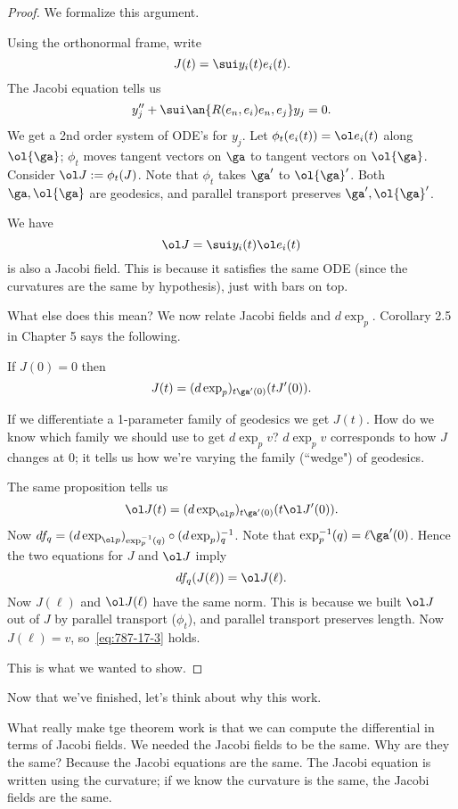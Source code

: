 \begin{proof}
We formalize this argument.

Using the orthonormal frame, write
\[
J(t)=\sui y_i(t) e_i(t). 
\]
The Jacobi equation tells us
\[
y_j''+\sui \an{R(e_n,e_i)e_n,e_j}y_j=0.
\]
We get a 2nd order system of ODE's for $y_j$. Let $\phi_t(e_i(t))=\ol e_i(t)$ along $\ol{\ga}$; $\phi_t$ moves tangent vectors on $\ga$ to tangent vectors on $\ol{\ga}$.  Consider $\ol J:=\phi_t(J)$. %
Note that $\phi_t$ takes $\ga'$ to $\ol{\ga}'$. Both $\ga,\ol{\ga}$ are geodesics, and parallel transport preserves $\ga',\ol{\ga}'$.

We have
\[
\ol J=\sui y_i(t)\ol e_i(t)
\] 
is also a Jacobi field. This is because it satisfies the same ODE (since the curvatures are the same by hypothesis), just with bars on top.

What else does this mean? We now relate Jacobi fields and $d\exp_p$. %
Corollary 2.5 in Chapter 5 says the following.
\begin{pr}
If $J(0)=0$ then 
\[J(t)=(d\exp_p)_{t\ga'(0)}(tJ'(0)).\]
\end{pr}
If we differentiate a 1-parameter family of geodesics we get $J(t)$. How do we know which family we should use to get $d\exp_pv$? %
$d\exp_pv$ corresponds to how $J$ changes at 0; it tells us how we're varying the family (``wedge") of geodesics.

The same proposition tells us
\[\ol J(t)=(d\exp_{\ol p})_{t\ga'(0)}(t\ol J'(0)).\]
Now $df_q=(d\exp_{\ol p})_{\exp_p^{-1}(q)}\circ (d\exp_p)_q^{-1}$. Note that $\exp_p^{-1}(q)=\ell \ga'(0)$. Hence the two equations for $J$ and $\ol J$ imply
\[
df_q(J(\ell))=\ol J(\ell).
\]
Now $J(\ell)$ and $\ol J(\ell)$ have the same norm. This is because we built $\ol J$ out of $J$ by parallel transport ($\phi_t$), and parallel transport preserves length. Now $J(\ell)=v$, so~\eqref{eq:787-17-3} holds.

This is what we wanted to show.
\end{proof}

Now that we've finished, let's think about why this work.

What really make tge theorem work is that we can compute the differential in terms of Jacobi fields. We needed the Jacobi fields to be the same. Why are they the same? Because the Jacobi equations are the same. The Jacobi equation is written using the curvature; if we know the curvature is the same, the Jacobi fields are the same.



